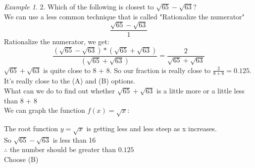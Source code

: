 \documentclass[10pt]{article}
\theoremstyle{remark}
\newtheorem*{example}{Example}
\begin{document}
\begin{example}
	2. Which of the following is closest to $\sqrt{65} - \sqrt{63}$?\\
	We can use a less common technique that is called "Rationalize the numerator"
	\[
		\frac{\sqrt{65} - \sqrt{63}}{1}
	\]
	Rationalize the numerator, we get:
	\[
		\frac{(\sqrt{65} - \sqrt{63}) * (\sqrt{65} + \sqrt{63})}{(\sqrt{65} + \sqrt{63})} = \frac{2}{\sqrt{65} + \sqrt{63}}
	\]
	$\sqrt{65} + \sqrt{63}$ is quite close to 8 + 8. So our fraction is really close to $\frac{2}{8 + 8} = 0.125$. It's really close to the (A) and (B) options.\\
	What can we do to find out whether $\sqrt{65} + \sqrt{63}$ is a little more or a little less than 8 + 8\\ 
	We can graph the function $f(x) = \sqrt{x}$:\\
	\begin{center}
	\end{center}
	The root function $y = \sqrt{x}$ is getting less and less steep as x increases.\\
	So $\sqrt{65} - \sqrt{63}$ is less than 16\\
	$\therefore$ the number should be greater than $0.125$\\
	Choose (B)\\
	\\
\end{example}
\end{document}
